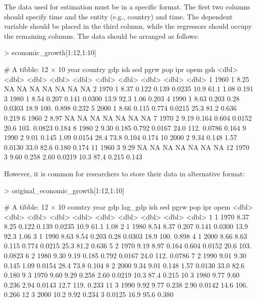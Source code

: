 \documentclass[a4paper]{article}
\begin{document}
The data used for estimation must be in a specific format.
The first two columns should specify time and the entity (e.g., country) and time.
The dependent variable should be placed in the third column, while the regressors should occupy the remaining columns.
The data should be arranged as follows:
\begin{Schunk}
\begin{Sinput}
> economic_growth[1:12,1:10]
\end{Sinput}
\begin{Soutput}
# A tibble: 12 × 10
    year country   gdp    ish    sed    pgrw   pop   ipr    opem    gsh
   <dbl>   <dbl> <dbl>  <dbl>  <dbl>   <dbl> <dbl> <dbl>   <dbl>  <dbl>
 1  1960       1  8.25 NA     NA     NA       NA    NA   NA      NA    
 2  1970       1  8.37  0.122  0.139  0.0235  10.9  61.1  1.08    0.191
 3  1980       1  8.54  0.207  0.141  0.0300  13.9  92.3  1.06    0.203
 4  1990       1  8.63  0.203  0.28   0.0303  18.9 100.   0.898   0.232
 5  2000       1  8.66  0.115  0.774  0.0215  25.3  81.2  0.636   0.219
 6  1960       2  8.97 NA     NA     NA       NA    NA   NA      NA    
 7  1970       2  9.19  0.164  0.604  0.0152  20.6 103.   0.0823  0.184
 8  1980       2  9.30  0.185  0.792  0.0167  24.0 112.   0.0786  0.164
 9  1990       2  9.01  0.145  1.09   0.0154  28.4  73.8  0.104   0.174
10  2000       2  9.34  0.148  1.57   0.0130  33.0  82.6  0.180   0.174
11  1960       3  9.29 NA     NA     NA       NA    NA   NA      NA    
12  1970       3  9.60  0.258  2.60   0.0219  10.3  87.4  0.215   0.143
\end{Soutput}
\end{Schunk}
However, it is common for researchers to store their data in alternative format:
\begin{Schunk}
\begin{Sinput}
> original_economic_growth[1:12,1:10]
\end{Sinput}
\begin{Soutput}
# A tibble: 12 × 10
   country  year   gdp lag_gdp   ish   sed   pgrw   pop   ipr   opem
     <dbl> <dbl> <dbl>   <dbl> <dbl> <dbl>  <dbl> <dbl> <dbl>  <dbl>
 1       1  1970  8.37    8.25 0.122 0.139 0.0235  10.9  61.1 1.08  
 2       1  1980  8.54    8.37 0.207 0.141 0.0300  13.9  92.3 1.06  
 3       1  1990  8.63    8.54 0.203 0.28  0.0303  18.9 100.  0.898 
 4       1  2000  8.66    8.63 0.115 0.774 0.0215  25.3  81.2 0.636 
 5       2  1970  9.19    8.97 0.164 0.604 0.0152  20.6 103.  0.0823
 6       2  1980  9.30    9.19 0.185 0.792 0.0167  24.0 112.  0.0786
 7       2  1990  9.01    9.30 0.145 1.09  0.0154  28.4  73.8 0.104 
 8       2  2000  9.34    9.01 0.148 1.57  0.0130  33.0  82.6 0.180 
 9       3  1970  9.60    9.29 0.258 2.60  0.0219  10.3  87.4 0.215 
10       3  1980  9.77    9.60 0.236 2.94  0.0143  12.7 119.  0.233 
11       3  1990  9.92    9.77 0.238 2.90  0.0142  14.6 106.  0.266 
12       3  2000 10.2     9.92 0.234 3     0.0125  16.9  95.6 0.380 
\end{Soutput}
\end{Schunk}
\end{document}

